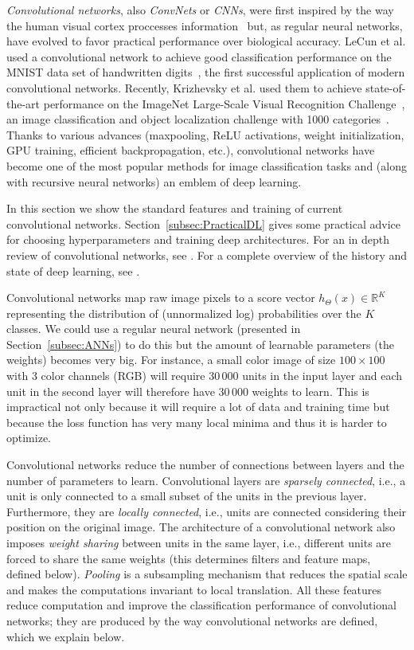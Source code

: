 \emph{Convolutional networks}, also \emph{ConvNets} or \emph{CNNs}, were first inspired by the way the human visual cortex proccesses information~\cite{Fukushima1980} but, as regular neural networks, have evolved to favor practical performance over biological accuracy. LeCun et al. used a convolutional network to achieve good classification performance on the MNIST data set of handwritten digits~\cite{LeCun1989, LeCun1998}, the first successful application of modern convolutional networks. Recently, Krizhevsky et al. used  them to achieve state-of-the-art performance on the ImageNet Large-Scale Visual Recognition Challenge~\cite{Krizhevsky2012}, an image classification and object localization challenge with 1000 categories~\cite{Russakovsky2014}. Thanks to various advances (maxpooling, ReLU activations, weight initialization, GPU training, efficient backpropagation, etc.), convolutional networks have become one of the most popular methods for image classification tasks and (along with recursive neural networks) an emblem of deep learning.

In this section we show the standard features and training of current convolutional networks. Section~\ref{subsec:PracticalDL} gives some practical advice for choosing hyperparameters and training deep architectures. For an in depth review of convolutional networks, see \cite{Karpathy2015}. For a complete overview of the history and state of deep learning, see \cite{Schmidhuber2015}.

Convolutional networks map raw image pixels to a score vector $h_\Theta(x) \in \mathbb{R}^K$ representing the distribution of (unnormalized log) probabilities over the $K$ classes. We could use a regular neural network (presented in Section~\ref{subsec:ANNs}) to do this but the amount of learnable parameters (the weights) becomes very big. For instance, a small color image of size $100\times100$ with 3 color channels (RGB) will require $30\,000$ units in the input layer and each unit in the second layer will therefore have $30\,000$ weights to learn. This is impractical not only because it will require a lot of data and training time but because the loss function has very many local minima and thus it is harder to optimize.

Convolutional networks reduce the number of connections between layers and the number of parameters to learn. Convolutional layers are \emph{sparsely connected}, i.e., a unit is only connected to a small subset of the units in the previous layer. Furthermore, they are \emph{locally connected}, i.e., units are connected considering their position on the original image. The architecture of a convolutional network also imposes \emph{weight sharing} between units in the same layer, i.e., different units are forced to share the same weights (this determines filters and feature maps, defined below). \emph{Pooling} is a subsampling mechanism that reduces the spatial scale and makes the computations invariant to local translation. All these features reduce computation and improve the classification performance of convolutional networks; they are produced by the way convolutional networks are defined, which we explain below.

